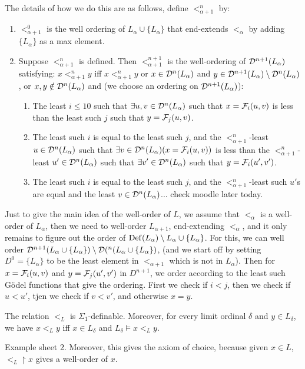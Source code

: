 \documentclass{article}
\begin{document}
The details of how we do this are as follows, define $<_{\alpha+1}^{n}$ by: \begin{enumerate}
    \item[(1)] $<_{\alpha+1}^{0}$ is the well ordering of $L_{\alpha} \cup \{L_{\alpha}\}$ that end-extends $<_{\alpha}$ by adding $\{L_{\alpha}\}$ as a max element.
    \item[(2)] Suppose $<_{\alpha+1}^{n}$ is defined. Then $<_{\alpha+1}^{n+1}$ is the well-ordering of $\mathcal{D}^{n+1}(L_{\alpha})$ satisfying: $x <_{\alpha+1}^{n} y$ iff $x <_{\alpha+1}^{n} y$ or $x \in \mathcal{D}^{n}(L_{\alpha})$ and $y \in \mathcal{D}^{n+1}(L_{\alpha})\setminus \mathcal{D}^{n}(L_{\alpha})$, or $x,y \notin \mathcal{D}^{n}(L_{\alpha})$ and (we choose an ordering on $\mathcal{D}^{n+1}(L_{\alpha})$):
          \begin{enumerate}
              \item [(a)] The least $i \leq 10$ such that $\exists u,v \in \mathcal{D}^{n}(L_{\alpha})$ such that $x=\mathcal{F}_{i}(u,v)$ is less than the least such $j$ such that $y=\mathcal{F}_{j}(u,v)$.
              \item[(b)] The least such $i$ is equal to the least such $j$, and the $<_{\alpha+1}^{n}$-least $u \in \mathcal{D}^{n}(L_{\alpha})$ such that $\exists v \in \mathcal{D}^{n}(L_{\alpha}) (x = \mathcal{F}_{i}(u,v))$ is less than the $<_{\alpha+1}^{n}$-least $u' \in \mathcal{D}^{n}(L_{\alpha})$ such that $\exists v' \in \mathcal{D}^{n}(L_{\alpha})$ such that $y=\mathcal{F}_{i}(u',v')$.
              \item[(c)] The least such $i$ is equal to the least such $j$, and the $<_{\alpha+1}^{n}$-least such $u'$s are equal and the least $v \in \mathcal{D}^{n}(L_{\alpha})$... check moodle later today.
          \end{enumerate}
\end{enumerate}
\endproof
\begin{remark*}
    Just to give the main idea of the well-order of $L$, we assume that $<_{\alpha}$ is a well-order of $L_{\alpha}$, then we need to well-order $L_{\alpha+1}$, end-extending $<_{\alpha}$, and it only remains to figure out the order of $\operatorname{Def}(L_{\alpha})\setminus L_{\alpha} \cup \{L_{\alpha}\}$. For this, we can well order $\mathcal{D}^{n+1}(L_{\alpha} \cup \{L_{\alpha}\})\setminus \mathcal{D}(^{n}(L_{\alpha} \cup \{L_{\alpha}\})$, (and we start off by setting $D^{0}=\{L_{\alpha}\}$ to be the least element in $<_{\alpha+1}$ which is not in $L_{\alpha}$). Then for $x= \mathcal{F}_{i}(u,v)$ and $y=\mathcal{F}_{j}(u',v')$ in $D^{n+1}$, we order according to the least such G\"odel functions that give the ordering. First we check if $i<j$, then we check if $u< u'$, tjen we check if $v<v'$, and otherwise $x=y$.
\end{remark*}
\begin{fancylem}{}
    The relation $<_{L}$ is $\Sigma_{1}$-definable. Moreover, for every limit ordinal $\delta$ and $y \in L_{\delta}$, we have $x<_{L}y$ iff $x \in L_{\delta}$ and $L_{\delta} \models x<_{L}y$.
\end{fancylem}
\proof Example sheet 2.\endproof
Moreover, this gives the axiom of choice, because given $x \in L$, $<_{L}\upharpoonright x$ gives a well-order of $x$.
\end{document}
